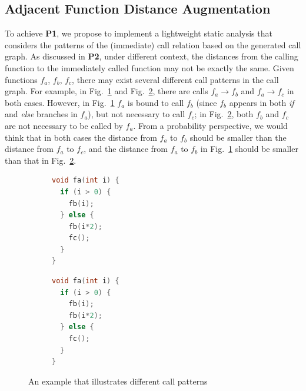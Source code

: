 \subsection{Adjacent Function Distance Augmentation} \label{subsec:functionDist}
To achieve \textbf{P1}, we propose to implement a lightweight static analysis that considers the patterns of the (immediate) call relation based on the generated call graph.
As discussed in \textbf{P2}, under different context, the distances from the calling function to the immediately called function may not be exactly the same. 
Given functions $f_a$, $f_b$, $f_c$, there may exist several different call patterns in the call graph. 
For example, in Fig.~\ref{subfig:dist1} and Fig.~\ref{subfig:dist2}, there are calls $f_a\rightarrow f_b$  and  $f_a\rightarrow f_c$ in both cases. 
However, in Fig.~\ref{subfig:dist1}  $f_a$ is bound to call $f_b$ (since $f_b$ appears in both \emph{if} and \emph{else} branches in $f_a$), but not necessary to call $f_c$; in Fig.~\ref{subfig:dist2}, both $f_b$ and $f_c$ are not necessary to be called by $f_a$.
From a probability perspective, we would think that in both cases the distance from $f_a$ to $f_b$ should be smaller than the distance from $f_a$ to $f_c$, and the distance from $f_a$ to $f_b$ in Fig.~\ref{subfig:dist1} should be smaller than that in  Fig.~\ref{subfig:dist2}. 


\begin{figure}[t]
    \centering
\begin{subfigure}[b]{0.36\columnwidth}
\begin{lstlisting}[language=c]
void fa(int i) {
  if (i > 0) {
    fb(i);
  } else {
    fb(i*2);
    fc();
  }
}
\end{lstlisting}  
\caption{}
\label{subfig:dist1}      
\end{subfigure}
\hspace{0.1in}
\centering
\begin{subfigure}[b]{0.36\columnwidth}
\begin{lstlisting}[language=c]        
void fa(int i) {
  if (i > 0) {
    fb(i);
    fb(i*2);
  } else {
    fc();
  }
}        
\end{lstlisting}
\caption{}
\label{subfig:dist2}      
\end{subfigure}
\caption{An example that illustrates different call patterns}
\label{figure:dists}
\end{figure}

